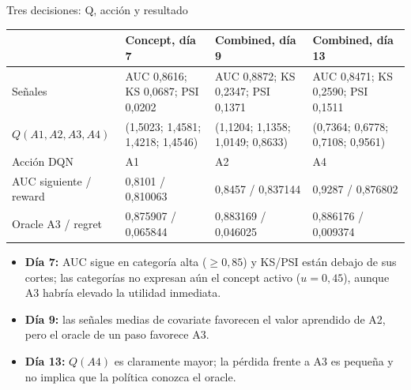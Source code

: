 \documentclass[aspectratio=169,10pt]{beamer}
\begin{document}
\begin{frame}{Tres decisiones: Q, acción y resultado}
\scriptsize
\setlength{\tabcolsep}{2pt}
\begin{tabular}{p{}p{}p{}p{}}
\toprule
 & \textbf{Concept, día 7} & \textbf{Combined, día 9} & \textbf{Combined, día 13} \\
\midrule
Señales & AUC 0,8616; KS 0,0687; PSI 0,0202 & AUC 0,8872; KS 0,2347; PSI 0,1371 & AUC 0,8471; KS 0,2590; PSI 0,1511 \\
\(Q(A1,A2,A3,A4)\) & (1,5023; 1,4581; 1,4218; 1,4546) & (1,1204; 1,1358; 1,0149; 0,8633) & (0,7364; 0,6778; 0,7108; 0,9561) \\
Acción DQN & A1 & A2 & A4 \\
AUC siguiente / reward & 0,8101 / 0,810063 & 0,8457 / 0,837144 & 0,9287 / 0,876802 \\
Oracle A3 / regret & 0,875907 / 0,065844 & 0,883169 / 0,046025 & 0,886176 / 0,009374 \\
\bottomrule
\end{tabular}

\vspace{0.6em}
\begin{itemize}
  \item \textbf{Día 7:} AUC sigue en categoría alta (\(\geq0,85\)) y KS/PSI
        están debajo de sus cortes; las categorías no expresan aún el concept
        activo (\(u=0,45\)), aunque A3 habría elevado la utilidad inmediata.
  \item \textbf{Día 9:} las señales medias de covariate favorecen el valor
        aprendido de A2, pero el oracle de un paso favorece A3.
  \item \textbf{Día 13:} \(Q(A4)\) es claramente mayor; la pérdida frente a A3
        es pequeña y no implica que la política conozca el oracle.
\end{itemize}
\end{frame}
\end{document}
